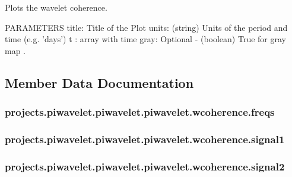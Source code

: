 Plots the wavelet coherence. 

P\-A\-R\-A\-M\-E\-T\-E\-R\-S title\-: Title of the Plot units\-: (string) Units of the period and time (e.\-g. 'days') t \-: array with time gray\-: Optional -\/ (boolean) True for gray map . 

\subsection{Member Data Documentation}
\hypertarget{classprojects_1_1piwavelet_1_1piwavelet_1_1piwavelet_1_1wcoherence_a04c6e1e9931771326ad92523d1f2b03a}{
\subsubsection[{freqs}]{\setlength{\rightskip}{0pt plus 5cm}projects.\-piwavelet.\-piwavelet.\-piwavelet.\-wcoherence.\-freqs}}\label{classprojects_1_1piwavelet_1_1piwavelet_1_1piwavelet_1_1wcoherence_a04c6e1e9931771326ad92523d1f2b03a}
\hypertarget{classprojects_1_1piwavelet_1_1piwavelet_1_1piwavelet_1_1wcoherence_a0f1a26d08a24a960d5aadda2a7132435}{
\subsubsection[{signal1}]{\setlength{\rightskip}{0pt plus 5cm}projects.\-piwavelet.\-piwavelet.\-piwavelet.\-wcoherence.\-signal1}}\label{classprojects_1_1piwavelet_1_1piwavelet_1_1piwavelet_1_1wcoherence_a0f1a26d08a24a960d5aadda2a7132435}
\hypertarget{classprojects_1_1piwavelet_1_1piwavelet_1_1piwavelet_1_1wcoherence_af647f5f8dff85e72debd8f0be20708a8}{
\subsubsection[{signal2}]{\setlength{\rightskip}{0pt plus 5cm}projects.\-piwavelet.\-piwavelet.\-piwavelet.\-wcoherence.\-signal2}}\label{classprojects_1_1piwavelet_1_1piwavelet_1_1piwavelet_1_1wcoherence_af647f5f8dff85e72debd8f0be20708a8}
